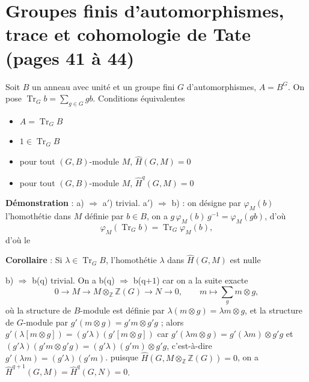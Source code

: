 \documentclass[11pt,a4paper]{article}
\begin{document}
\section*{Groupes finis d'automorphismes, trace et cohomologie de Tate (pages 41 à 44)}

Soit $B$ un anneau avec unité et un groupe fini $G$ d'automorphismes,
$A = B^{G}$. On pose $\operatorname{Tr}_{G} b = \sum_{g \in G} gb$.
Conditions équivalentes 
\begin{itemize}
\item[a)] $A = \operatorname{Tr}_{G} B$
\item[a$'$)] $1 \in \operatorname{Tr}_{G} B$
\item[b)] pour tout $(G,B)$-module $M$, $\hat{H}(G,M) = 0$
\item[b(q))] pour tout $(G,B)$-module $M$, $\hat{H}^{q}(G,M) = 0$
\end{itemize}

\textbf{Démonstration} : a) $\Rightarrow$ a$'$) trivial. a$'$) $\Rightarrow$
b) : \ill{} on désigne par $\varphi_{M}(b)$ l'homothétie dans $M$ définie
par $b \in B$, on a $g\,\varphi_{M}(b)\,g^{-1} = \varphi_{M}(gb)$, d'où
\[
\varphi_{M}(\operatorname{Tr}_{G} b) = \operatorname{Tr}_{G}\varphi_{M}(b),
\]
d'où le

\textbf{Corollaire} : Si $\lambda \in \operatorname{Tr}_{G} B$,
l'homothétie $\lambda$ dans $\hat{H}(G,M)$ est nulle

b) $\Rightarrow$ b(q) trivial. On a b(q) $\Rightarrow$ b(q$+1$) car on a la
suite exacte
\[
0 \to M \to M \otimes_{\mathbb{Z}} \mathbb{Z}(G) \to N \to 0,
\qquad m \mapsto \sum_{g} m \otimes g,
\]
où la structure de $B$-module est définie par $\lambda(m \otimes g) =
\lambda m \otimes g$, et la structure de $G$-module par $g'(m \otimes g) =
g'm \otimes g'g$ ; alors $g'(\lambda[m \otimes g]) = (g'\lambda)(g'[m
\otimes g])$ car $g'(\lambda m \otimes g) = g'(\lambda m) \otimes g'g$ et
$(g'\lambda)(g'm \otimes g'g) = (g'\lambda)(g'm) \otimes g'g$,
c'est-à-dire $g'(\lambda m) = (g'\lambda)(g'm)$. \ill{} puisque
$\hat{H}(G, M \otimes_{\mathbb{Z}} \mathbb{Z}(G)) = 0$, on a
$\hat{H}^{q+1}(G,M) = \hat{H}^{q}(G,N) = 0$. \ill{}
\end{document}
